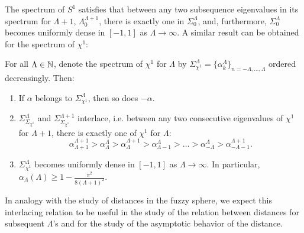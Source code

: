 The spectrum of $S^1$ satisfies that between any two subsequence eigenvalues in its spectrum for $\Lambda + 1$, $\Lambda_0^{\Lambda + 1}$, there is exactly one in $\Sigma_0^\Lambda$, and, furthermore, $\Sigma_0^\Lambda$ becomes uniformly dense in $[-1, 1]$ as $\Lambda \to \infty$. A similar result \cite{FioreXi2020, FioreTheCase2020} can be obtained for the spectrum of $\chi^1$:
\begin{theorem}
For all $\Lambda \in \mathbb{N}$, denote the spectrum of $\chi^1$ for $\Lambda$ by $\Sigma^\Lambda_{\chi^1} = \{\alpha_k^\Lambda\}_{n = -\Lambda, \dots, \Lambda }$ ordered decreasingly. Then:
\begin{enumerate}
    \item If $\alpha$ belongs to $\Sigma^\Lambda_{\chi^1}$, then so does $-\alpha$.
    
    \item $\Sigma_{\Sigma_{\chi^1}}^\Lambda$ and $\Sigma_{\Sigma_{\chi^1}}^{\Lambda+1}$ interlace, i.e. between any two consecutive eigenvalues of $\chi^1$ for $\Lambda +1$, there is exactly one of $\chi^1$ for $\Lambda$:
    \begin{equation}
        \alpha_{\Lambda+1}^{\Lambda+1} > \alpha_{\Lambda}^{\Lambda} > \alpha_\Lambda^{\Lambda+1} > \alpha_{\Lambda-1}^{\Lambda} > \dots > \alpha_{-\Lambda}^{\Lambda} > \alpha_{-\Lambda-1}^{\Lambda+1}.
    \end{equation}
    
    \item $\Sigma_{\chi^1}^\Lambda$ becomes uniformly dense in $[-1, 1]$ as $\Lambda \to \infty$. In particular, $\alpha_{\Lambda}(\Lambda) \geq 1 - \frac{\pi^2}{8(\Lambda + 1)^2}$.
\end{enumerate}
\end{theorem}

In analogy with the study of distances in the fuzzy sphere, we expect this interlacing relation to be useful in the study of the relation between distances for subsequent $\Lambda$'s and for the study of the asymptotic behavior of the distance.